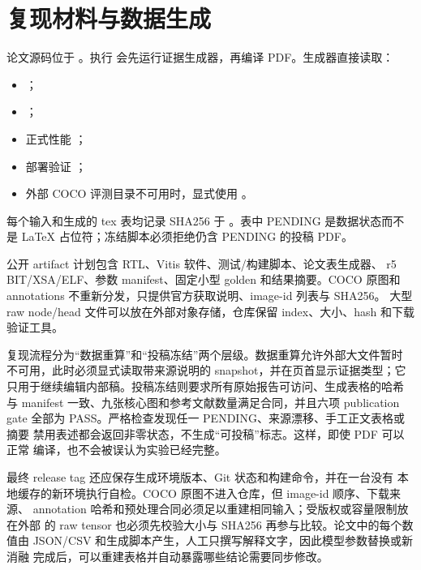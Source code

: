 \section{复现材料与数据生成}
\label{app:repro}

论文源码位于 。执行
 会先运行证据生成器，再编译 PDF。生成器直接读取：
\begin{itemize}[leftmargin=1.8em]
  \item {}；
  \item {}；
  \item 正式性能 ；
  \item 部署验证 ；
  \item 外部 COCO 评测目录不可用时，显式使用
  。
\end{itemize}
每个输入和生成的 tex 表均记录 SHA256 于
。表中 PENDING 是数据状态而不是
LaTeX 占位符；冻结脚本必须拒绝仍含 PENDING 的投稿 PDF。

公开 artifact 计划包含 RTL、Vitis 软件、测试/构建脚本、论文表生成器、
r5 BIT/XSA/ELF、参数 manifest、固定小型 golden 和结果摘要。COCO 原图和
annotations 不重新分发，只提供官方获取说明、image-id 列表与 SHA256。
大型 raw node/head 文件可以放在外部对象存储，仓库保留 index、大小、hash
和下载验证工具。

复现流程分为“数据重算”和“投稿冻结”两个层级。数据重算允许外部大文件暂时
不可用，此时必须显式读取带来源说明的 snapshot，并在页首显示证据类型；它
只用于继续编辑内部稿。投稿冻结则要求所有原始报告可访问、生成表格的哈希
与 manifest 一致、九张核心图和参考文献数量满足合同，并且六项 publication
gate 全部为 PASS。严格检查发现任一 PENDING、来源漂移、手工正文表格或摘要
禁用表述都会返回非零状态，不生成“可投稿”标志。这样，即使 PDF 可以正常
编译，也不会被误认为实验已经完整。

最终 release tag 还应保存生成环境版本、Git 状态和构建命令，并在一台没有
本地缓存的新环境执行自检。COCO 原图不进入仓库，但 image-id 顺序、下载来源、
annotation 哈希和预处理合同必须足以重建相同输入；受版权或容量限制放在外部
的 raw tensor 也必须先校验大小与 SHA256 再参与比较。论文中的每个数值由
JSON/CSV 和生成脚本产生，人工只撰写解释文字，因此模型参数替换或新消融
完成后，可以重建表格并自动暴露哪些结论需要同步修改。


